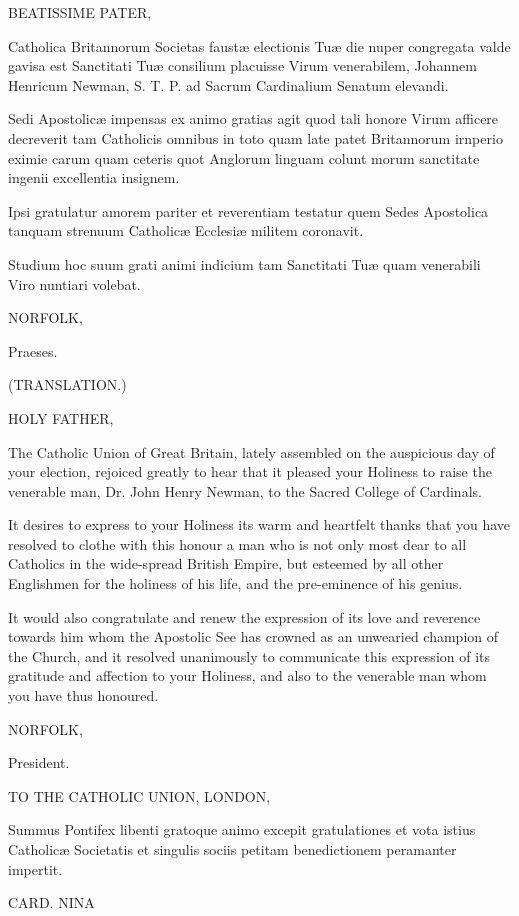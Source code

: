 BEATISSIME PATER,

Catholica Britannorum Societas faustæ electionis Tuæ die nuper
congregata valde gavisa est Sanctitati Tuæ consilium placuisse Virum
venerabilem, Johannem Henricum Newman, S. T. P. ad Sacrum Cardinalium
Senatum elevandi.

Sedi Apostolicæ impensas ex animo gratias agit quod tali honore
Virum afficere decreverit tam Catholicis omnibus in toto quam late
patet Britannorum irnperio eximie carum quam ceteris quot Anglorum
linguam colunt morum sanctitate ingenii excellentia insignem.

Ipsi gratulatur amorem pariter et reverentiam testatur quem Sedes
Apostolica tanquam strenuum Catholicæ Ecclesiæ militem coronavit.

Studium hoc suum grati animi indicium tam Sanctitati Tuæ quam
venerabili Viro nuntiari volebat.

NORFOLK,

Praeses.

(TRANSLATION.)

HOLY FATHER,

The Catholic Union of Great Britain, lately assembled on the
auspicious day of your election, rejoiced greatly to hear that it
pleased your Holiness to raise the venerable man, Dr. John Henry
Newman, to the Sacred College of Cardinals.

It desires to express to your Holiness its warm and heartfelt
thanks that you have resolved to clothe with this honour a man who is
not only most dear to all Catholics in the wide-spread British Empire,
but esteemed by all other Englishmen for the holiness of his life, and
the pre-eminence of his genius.

It would also congratulate and renew the expression of its love and
reverence towards him whom the Apostolic See has crowned as an
unwearied champion of the Church, and it resolved unanimously to
communicate this expression of its gratitude and affection to your
Holiness, and also to the venerable man whom you have thus honoured.

NORFOLK,

President.


TO THE CATHOLIC
UNION, LONDON,

Summus Pontifex libenti gratoque animo excepit gratulationes et vota
istius Catholicæ Societatis et singulis sociis petitam benedictionem
peramanter impertit.

CARD. NINA

